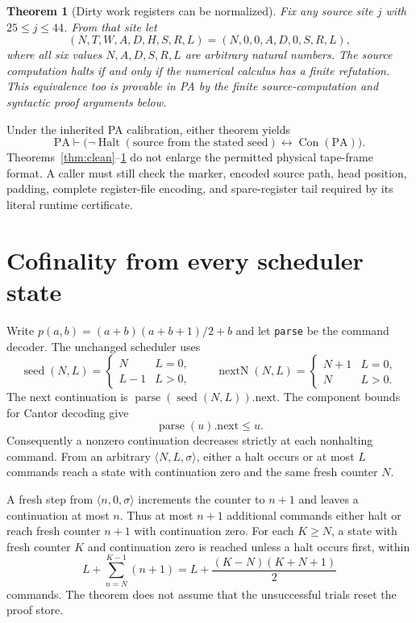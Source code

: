 \documentclass[11pt]{article}
\newtheorem{theorem}{Theorem}
\newcommand{\PA}{\mathrm{PA}}
\newcommand{\Con}{\operatorname{Con}}
\newcommand{\Halt}{\operatorname{Halt}}
\begin{document}
\begin{theorem}[Dirty work registers can be normalized]\label{thm:dirty}
Fix any source site $j$ with $25\le j\le44$. From that site let
\[
          (N,T,W,A,D,H,S,R,L)=(N,0,0,A,D,0,S,R,L),
\tag{3}
\]
where all six values $N,A,D,S,R,L$ are arbitrary natural numbers.
The source computation halts if and only if the numerical calculus has a
finite refutation. This equivalence too is provable in PA by the finite
source-computation and syntactic proof arguments below.
\end{theorem}

Under the inherited PA calibration, either theorem yields
\[
 \PA\vdash \bigl(\neg\Halt(\text{source from the stated seed})
                  \leftrightarrow\Con(\PA)\bigr).
\]
Theorems~\ref{thm:clean}--\ref{thm:dirty} do not enlarge the permitted
physical tape-frame format. A caller must still check the marker, encoded
source path, head position, padding, complete register-file encoding, and
spare-register tail required by its literal runtime certificate.

\section{Cofinality from every scheduler state}

Write $p(a,b)=(a+b)(a+b+1)/2+b$ and let \texttt{parse} be the command
decoder. The unchanged scheduler uses
\[
 \operatorname{seed}(N,L)=
 \begin{cases}N&L=0,\\L-1&L>0,\end{cases}
 \qquad
 \operatorname{nextN}(N,L)=
 \begin{cases}N+1&L=0,\\N&L>0.\end{cases}
\tag{4}
\]
The next continuation is
$\operatorname{parse}(\operatorname{seed}(N,L)).\mathrm{next}$.
The component bounds for Cantor decoding give
\[
                 \operatorname{parse}(u).\mathrm{next}\le u.
\tag{5}
\]
Consequently a nonzero continuation decreases strictly at each
nonhalting command. From an arbitrary $\langle N,L,\sigma\rangle$,
either a halt occurs or at most $L$ commands reach a state with continuation
zero and the same fresh counter $N$.

A fresh step from $\langle n,0,\sigma\rangle$ increments the counter to
$n+1$ and leaves a continuation at most $n$. Thus at most $n+1$ additional
commands either halt or reach fresh counter $n+1$ with continuation zero.
For each $K\ge N$, a state with fresh counter $K$ and continuation zero
is reached unless a halt occurs first, within
\[
        L+\sum_{n=N}^{K-1}(n+1)
       =L+\frac{(K-N)(K+N+1)}2
\tag{6}
\]
commands. The theorem does not assume that the unsuccessful trials reset
the proof store.
\end{document}
